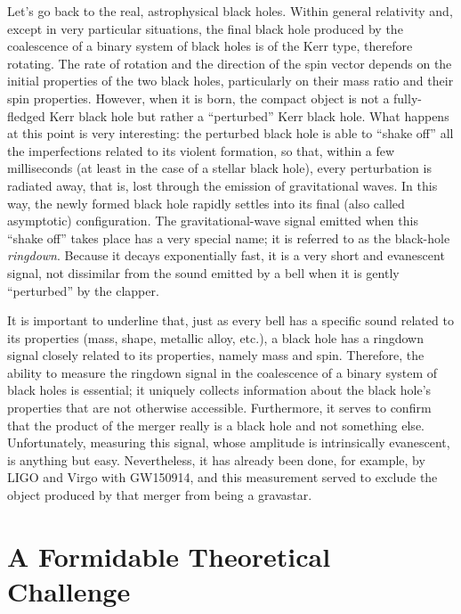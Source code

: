 Let's go back to the real, astrophysical black holes. Within general relativity and,
except in very particular situations, the final black hole produced by the coalescence
of a binary system of black holes is of the Kerr type, therefore rotating. The rate of
rotation and the direction of the spin vector depends on the initial properties of the
two black holes, particularly on their mass ratio and their spin properties. However,
when it is born, the compact object is not a fully-fledged Kerr black
hole but rather a ``perturbed'' Kerr black hole.
What happens at this point is very interesting: the perturbed black hole is able to
``shake off'' all the imperfections related to its violent formation, so that, within a
few milliseconds (at least in the case of a stellar black hole), every perturbation is
radiated away, that is, lost through the emission of gravitational waves. In this way,
the newly formed black hole rapidly settles into its final (also called asymptotic)
configuration. The gravitational-wave signal emitted when this ``shake off'' takes place
has a very special name; it is referred to as the black-hole
\emph{ringdown}. Because it decays exponentially fast, it is a very
short and evanescent signal, not dissimilar from the sound emitted by a bell when it is
gently ``perturbed'' by the clapper.

It is important to underline that, just as every bell has a specific sound related to
its properties (mass, shape, metallic alloy, etc.), a black hole has a ringdown signal
closely related to its properties, namely mass and spin. Therefore, the ability to
measure the ringdown signal in the coalescence of a binary system of black holes is
essential; it uniquely collects information about the black hole's properties that are
not otherwise accessible. Furthermore, it serves to confirm that the product of the
merger really is a black hole and not something else. Unfortunately, measuring this
signal, whose amplitude is intrinsically evanescent, is anything but easy. Nevertheless,
it has already been done, for example, by LIGO and Virgo with
GW150914, and this measurement served to exclude the object produced
by that merger from being a gravastar.

\section{A Formidable Theoretical Challenge}\label{sec:08-numerics}

